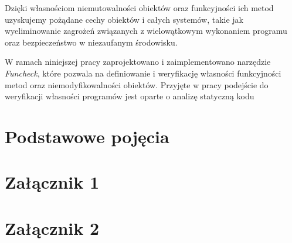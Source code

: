 \documentclass{pracamgr}
\begin{document}
Dzięki własnościom niemutowalności obiektów oraz funkcyjności ich
metod uzyskujemy pożądane cechy obiektów i całych systemów, takie jak
wyeliminowanie zagrożeń związanych z wielowątkowym wykonaniem programu
oraz bezpieczeństwo w niezaufanym środowisku.

W ramach niniejszej pracy zaprojektowano i zaimplementowano narzędzie
\emph{Funcheck}, które pozwala na definiowanie i weryfikację własności
funkcyjności metod oraz niemodyfikowalności obiektów. Przyjęte w pracy
podejście do weryfikacji własności programów jest oparte o analizę
statyczną kodu

\chapter{Podstawowe pojęcia}\label{r:pojecia}



\appendix

\chapter{Załącznik 1}
\chapter{Załącznik 2} %


{}

\end{document}

